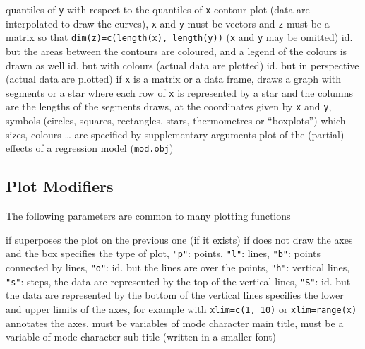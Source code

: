 {	{quantiles of {\tt y} with respect to the quantiles of {\tt x}}
	{contour plot (data are interpolated to draw the curves), {\tt x} and {\tt y} must be vectors and {\tt z} must be a matrix so that {\tt dim(z)=c(length(x), length(y))} ({\tt x} and {\tt y} may be omitted)}
	{ id. but the areas between the contours are coloured, and a legend of the colours is drawn as well}
	{ id. but with colours (actual data are plotted)}
	{ id. but in perspective (actual data are plotted)}
	{if {\tt x} is a matrix or a data frame, draws a graph with segments or a star where each row of {\tt x} is represented by a star and the columns are the lengths of the segments}
	{draws, at the coordinates given by {\tt x} and {\tt y}, symbols (circles, squares, rectangles, stars, thermometres or ``boxplots'') which sizes, colours \ldots{} are specified by supplementary arguments}
	{ plot of the (partial) effects of a regression model ({\tt mod.obj})}

\subsection{Plot Modifiers}{The following parameters are common to many
    plotting functions}

	{if \T superposes the plot on the previous one (if it exists)}
	{if \F does not draw the axes and the box}
	{ specifies the type of plot, {\tt "p"}: points, {\tt "l"}: lines, {\tt "b"}: points connected by lines, {\tt "o"}: id. but the lines are over the points, {\tt "h"}: vertical lines, {\tt "s"}: steps, the data are represented by the top of the vertical lines, {\tt "S"}: id. but the data are represented by the bottom of the vertical lines}
	{specifies the lower and upper limits of the axes, for example with {\tt xlim=c(1, 10)} or {\tt xlim=range(x)}}
	{ annotates the axes, must be variables of mode character}
	{ main title, must be a variable of mode character}
	{ sub-title (written in a smaller font)}

}
